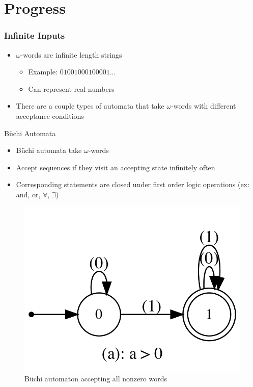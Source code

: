 \documentclass[leqno,presentation]{beamer}
\begin{document}
\section{Progress}

\begin{frame}
  \frametitle{Infinite Inputs}
  \begin{itemize}
      \item $\omega$-words are infinite length strings
      \begin{itemize}
          \item Example: $01001000100001...$
          \item Can represent real numbers
      \end{itemize}
      \item There are a couple types of automata that take $\omega$-words with different acceptance conditions
  \end{itemize}
\end{frame}

\begin{frame}{B\"uchi Automata}
    \begin{itemize}
          \item B\"uchi automata take $\omega$-words
          \item Accept sequences if they visit an accepting state infinitely often
          \item Corresponding statements are closed under first order logic operations (ex: and, or, $\forall$, $\exists$)
      \end{itemize}
       \begin{figure}
            \centering
            \includegraphics[height=0.45\textheight]{images/buchi_ex.jpg}
            \caption{B\"uchi automaton accepting all nonzero words}
        \end{figure}
\end{frame}
\end{document}
